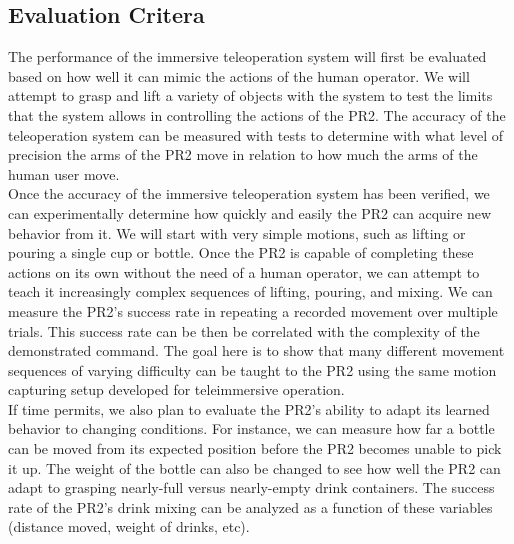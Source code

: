 \documentclass{sig-alternate}
\begin{document}
\subsection{Evaluation Critera}
\indent The performance of the immersive teleoperation system will
first be evaluated based on how well it can mimic the actions of
the human operator. We will attempt to grasp and lift a variety of
objects with the system to test the limits that the system allows in
controlling the actions of the PR2. The accuracy of the teleoperation
system can be measured with tests to determine with what level of precision
the arms of the PR2 move in relation to how much the arms of the human user move.\\
\indent Once the accuracy of the immersive teleoperation system has been verified, 
we can experimentally determine how quickly
and easily the PR2 can acquire new behavior from it. We will start
with very simple motions, such as lifting or pouring
a single cup or bottle. Once the PR2 is capable of completing
these actions on its own without the need of a human operator,
we can attempt to teach it increasingly complex sequences
of lifting, pouring, and mixing. We can measure the PR2's success
rate in repeating a recorded movement over multiple trials.
This success rate can be then be correlated with the complexity
of the demonstrated command. The goal here is to
show that many different movement sequences of varying
difficulty can be taught to the PR2 using the same motion
capturing setup developed for teleimmersive operation.\\
\indent If time permits, we also plan to evaluate the PR2's ability
to adapt its learned behavior to changing conditions. For instance, we can
measure how far a bottle can be moved from its expected
position before the PR2 becomes unable to pick it up. The
weight of the bottle can also be changed to see how well the
PR2 can adapt to grasping nearly-full versus nearly-empty
drink containers. The success rate of the PR2's drink mixing
can be analyzed as a function of these variables (distance
moved, weight of drinks, etc).
\end{document}
